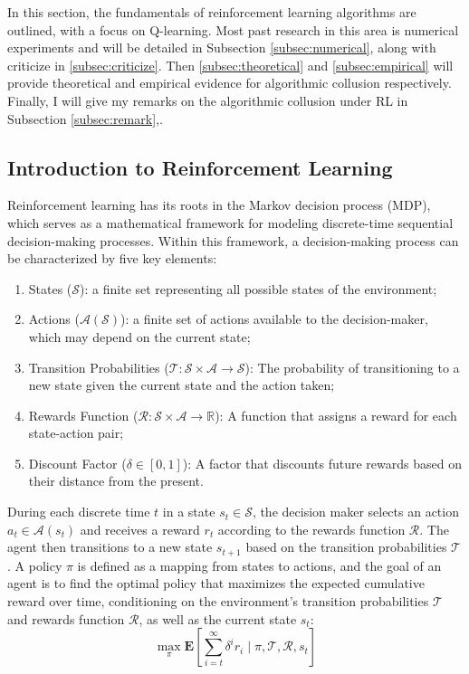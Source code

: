 \documentclass[mnsc,nonblindrev]{workingpaper}
\begin{document}
In this section, the fundamentals of reinforcement learning algorithms are outlined, with a focus on Q-learning. Most past research in this area is numerical experiments and will be detailed in Subsection \ref{subsec:numerical}, along with criticize in \ref{subsec:criticize}. Then \ref{subsec:theoretical} and \ref{subsec:empirical} will provide theoretical and empirical evidence for algorithmic collusion respectively. Finally, I will give my remarks on the algorithmic collusion under RL in Subsection \ref{subsec:remark},.

\subsection{Introduction to Reinforcement Learning}
\label{subsec:irl}

Reinforcement learning has its roots in the Markov decision process (MDP), which serves as a mathematical framework for modeling discrete-time sequential decision-making processes. Within this framework, a decision-making process can be characterized by five key elements:
\begin{enumerate}
	\item States ($\mathcal{S}$): a finite set representing all possible states of the environment;
	\item Actions ($\mathcal{A}(\mathcal{S})$): a finite set of actions available to the decision-maker, which may depend on the current state;
	\item Transition Probabilities ($\mathcal{T}:\mathcal{S}\times\mathcal{A}\to \mathcal{S}$): The probability of transitioning to a new state given the current state and the action taken;
	\item Rewards Function ($\mathcal{R}:\mathcal{S}\times\mathcal{A}\to \mathbb{R}$): A function that assigns a reward for each state-action pair;
	\item Discount Factor ($\delta\in[0,1]$):  A factor that discounts future rewards based on their distance from the present.
\end{enumerate}
During each discrete time $t$ in a state $s_t\in \mathcal{S}$, the decision maker selects an action $a_t\in\mathcal{A}(s_t)$ and receives a reward $r_t$ according to the rewards function $\mathcal{R}$. The agent then transitions to a new state $s_{t+1}$ based on the transition probabilities $\mathcal{T}$. A policy $\pi$ is defined as a mapping from states to actions, and the goal of an agent is to find the optimal policy that maximizes the expected cumulative reward over time, conditioning on the environment's transition probabilities $\mathcal{T}$ and rewards function $\mathcal{R}$, as well as the current state $s_t$:
\[
    \max_{\pi}\mathbf{E}\left[\sum_{i=t}^{\infty} \delta^i r_i\mid \pi, \mathcal{T},\mathcal{R},s_t\right] 
\]
\end{document}
